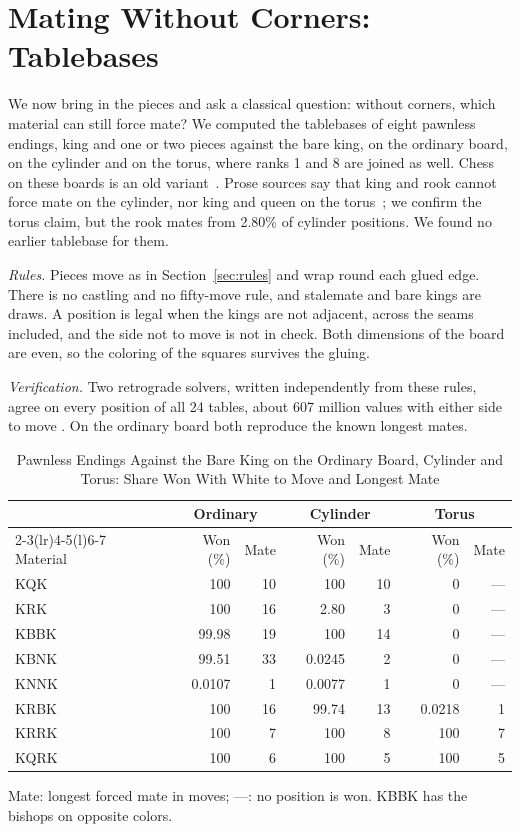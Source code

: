 \section{Mating Without Corners: Tablebases}\label{sec:tb}

We now bring in the pieces and ask a classical question: without corners, which material can still force
mate? We computed the tablebases of eight pawnless endings, king and one or two pieces against the bare
king, on the ordinary board, on the cylinder and on the torus, where ranks 1 and 8 are joined as well. Chess
on these boards is an old variant~\cite{Pritchard}. Prose sources say that king and rook cannot force mate
on the cylinder, nor king and queen on the torus~\cite{WikiCylinder,HGMCylinder}; we confirm the torus claim,
but the rook mates from 2.80\% of cylinder positions. We found no earlier tablebase for them.

\emph{Rules.} Pieces move as in Section~\ref{sec:rules} and wrap round each glued edge. There is no castling
and no fifty-move rule, and stalemate and bare kings are draws. A position is legal when the kings are not
adjacent, across the seams included, and the side not to move is not in check. Both dimensions of the board
are even, so the coloring of the squares survives the gluing.

\emph{Verification.} Two retrograde solvers, written independently from these rules, agree on every position
of all 24 tables, about 607 million values with either side to move . On the ordinary board both
reproduce the known longest mates.

\begin{table}[!t]
\centering
\caption{Pawnless Endings Against the Bare King on the Ordinary Board, Cylinder and Torus: Share Won With
White to Move and Longest Mate }
\label{tab:tb}
\footnotesize
\setlength{\tabcolsep}{4.5pt}
\begin{tabular}{@{}lrrrrrr@{}}
\toprule
& \multicolumn{2}{c}{Ordinary} & \multicolumn{2}{c}{Cylinder} & \multicolumn{2}{c}{Torus} \\
\cmidrule(lr){2-3}\cmidrule(lr){4-5}\cmidrule(l){6-7}
Material & Won (\%) & Mate & Won (\%) & Mate & Won (\%) & Mate \\
\midrule
KQK  & 100    & 10 & 100    & 10 & 0      & --- \\
KRK  & 100    & 16 & 2.80   & 3  & 0      & --- \\
KBBK & 99.98  & 19 & 100    & 14 & 0      & --- \\
KBNK & 99.51  & 33 & 0.0245 & 2  & 0      & --- \\
KNNK & 0.0107 & 1  & 0.0077 & 1  & 0      & --- \\
KRBK & 100    & 16 & 99.74  & 13 & 0.0218 & 1   \\
KRRK & 100    & 7  & 100    & 8  & 100    & 7   \\
KQRK & 100    & 6  & 100    & 5  & 100    & 5   \\
\bottomrule
\end{tabular}

\smallskip
\parbox{\columnwidth}{\footnotesize Mate: longest forced mate in moves; ---: no position is won. KBBK has
the bishops on opposite colors.}
\end{table}

